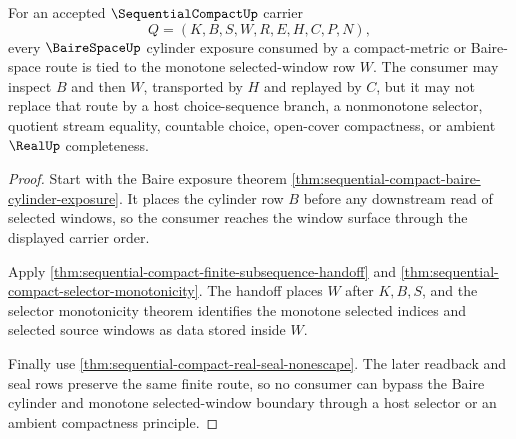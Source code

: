\begin{theorem}
\label{thm:sequential-compact-cylinder-monotone-window}
For an accepted $\SequentialCompactUp$ carrier
$$
Q=(K,B,S,W,R,E,H,C,P,N),
$$
every $\BaireSpaceUp$ cylinder exposure consumed by a compact-metric or Baire-space route is tied to the monotone selected-window row $W$. The consumer may inspect $B$ and then $W$, transported by $H$ and replayed by $C$, but it may not replace that route by a host choice-sequence branch, a nonmonotone selector, quotient stream equality, countable choice, open-cover compactness, or ambient $\RealUp$ completeness.
\end{theorem}
\begin{proof}
Start with the Baire exposure theorem \autoref{thm:sequential-compact-baire-cylinder-exposure}. It places the cylinder row $B$ before any downstream read of selected windows, so the consumer reaches the window surface through the displayed carrier order.

Apply \autoref{thm:sequential-compact-finite-subsequence-handoff} and \autoref{thm:sequential-compact-selector-monotonicity}. The handoff places $W$ after $K,B,S$, and the selector monotonicity theorem identifies the monotone selected indices and selected source windows as data stored inside $W$.

Finally use \autoref{thm:sequential-compact-real-seal-nonescape}. The later readback and seal rows preserve the same finite route, so no consumer can bypass the Baire cylinder and monotone selected-window boundary through a host selector or an ambient compactness principle.
\end{proof}

